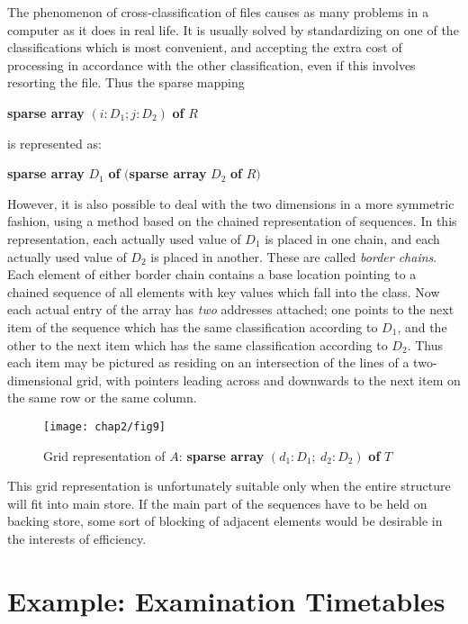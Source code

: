 The phenomenon of cross-classification of files causes as many problems in a computer as it does in real life. It is usually solved by standardizing on one of the classifications which is most convenient, and accepting the extra cost of processing in accordance with the other classification, even if this involves resorting the file. Thus the sparse mapping

\quad \textbf{sparse array} $(i:D_1; j:D_2)$ \textbf{of} $R$

\noindent
is represented as:

\quad \textbf{sparse array} $D_1$ \textbf{of} $($\textbf{sparse array} $D_2$ \textbf{of} $R)$

However, it is also possible to deal with the two dimensions in a more symmetric fashion, using a method based on the chained representation of sequences. In this representation, each actually used value of $D_1$ is placed in one chain, and each actually used value of $D_2$ is placed in another. These are called \textit{border chains}. Each element of either border chain contains a base location pointing to a chained sequence of all elements with key values which fall into the class. Now each actual entry of the array has \textit{two} addresses attached; one points to the next item of the sequence which has the same classification according to $D_1$, and the other to the next item which has the same classification according to $D_2$. Thus each item may be pictured as residing on an intersection of the lines of a two-dimensional grid, with pointers leading across and downwards to the next item on the same row or the same column.

\begin{figure}[h]
	\centering
	\texttt{[image: chap2/fig9]}
	\caption{Grid representation of $A$: \textbf{sparse array} $(d_1: D_1;\ d_2: D_2)$ \textbf{of} $T$}
\end{figure}

This grid representation is unfortunately suitable only when the entire structure will fit into main store. If the main part of the sequences have to be held on backing store, some sort of blocking of adjacent elements would be desirable in the interests of efficiency.

\section[Example: Examination timetables]{Example: Examination Timetables}
\label{sec:example-examination}

